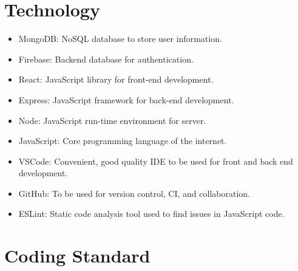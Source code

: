\documentclass{article}
\begin{document}


\section{Technology}

\begin{itemize}
\item MongoDB: NoSQL database to store user information.
\item Firebase: Backend database for authentication.
\item React: JavaScript library for front-end development.
\item Express: JavaScript framework for back-end development.
\item Node: JavaScript run-time environment for server.
\item JavaScript: Core programming language of the internet.
\item VSCode: Convenient, good quality IDE to be used for front and back end development.
\item GitHub: To be used for version control, CI, and collaboration.
\item ESLint: Static code analysis tool used to find issues in JavaScript code.

\end{itemize}

\section{Coding Standard}
\end{document}
